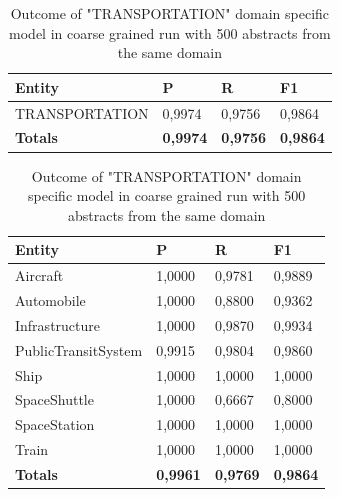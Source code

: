 \documentclass[thesis=M,english]{FITthesis}[2018/05/30]
\begin{document}
	\begin{table}[H]\centering
		\begin{tabular}{|l|l|l|l|}
			\hline {\textbf{Entity}} & {\textbf{P}} & {\textbf{R}} & {\textbf{F1}}\\\hline
				TRANSPORTATION & 0,9974 & 0,9756 & 0,9864\\\hline
				\textbf{Totals} & \textbf{0,9974} & \textbf{0,9756} & \textbf{0,9864}\\\hline
		\end{tabular}
		\caption{Outcome of "TRANSPORTATION" domain specific model in coarse grained run with 500 abstracts from the same domain \label{table:500TransportationDomainWithTransportationTop500Coarse}}
	\end{table}
	
	
	\begin{table}[H]\centering
		\begin{tabular}{|l|l|l|l|}
			\hline {\textbf{Entity}} & {\textbf{P}} & {\textbf{R}} & {\textbf{F1}}\\\hline
				Aircraft & 1,0000 & 0,9781 & 0,9889\\
				Automobile & 1,0000 & 0,8800 & 0,9362\\				
				Infrastructure & 1,0000 & 0,9870 & 0,9934\\
				PublicTransitSystem & 0,9915 & 0,9804 & 0,9860\\
				Ship & 1,0000 & 1,0000 & 1,0000\\				
				SpaceShuttle & 1,0000 & 0,6667 & 0,8000\\
				SpaceStation & 1,0000 & 1,0000 & 1,0000\\
				Train & 1,0000 & 1,0000 & 1,0000\\\hline
				\textbf{Totals} & \textbf{0,9961} & \textbf{0,9769} & \textbf{0,9864}\\\hline
		\end{tabular}
		\caption{Outcome of "TRANSPORTATION" domain specific model in coarse grained run with 500 abstracts from the same domain \label{table:500TransportationDomainWithTransportationTop500Fine}}
	\end{table}	
		
\end{document}
